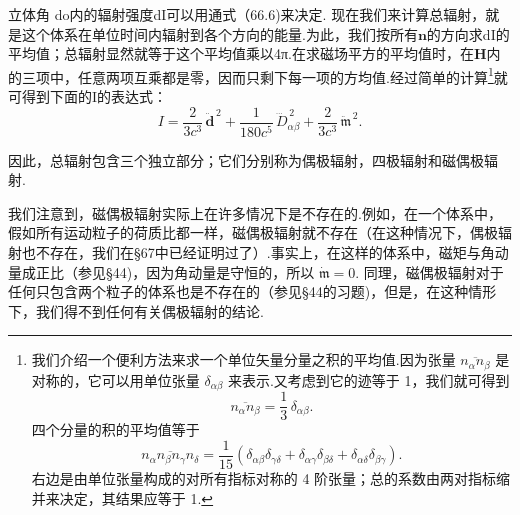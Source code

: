 立体角 do内的辐射强度dI可以用通式（66.6)来决定. 现在我们来计算总辐射，就是这个体系在单位时间内辐射到各个方向的能量.为此，我们按所有$\boldsymbol{n}$的方向求dI的平均值；总辐射显然就等于这个平均值乘以4π.在求磁场平方的平均值时，在$\boldsymbol{H}$内的三项中，任意两项互乘都是零，因而只剩下每一项的方均值.经过简单的计算\footnote{我们介绍一个便利方法来求一个单位矢量分量之积的平均值.因为张量 $\overline{n_\alpha n_\beta}$ 是对称的，它可以用单位张量 $\delta_{\alpha\beta}$ 来表示.又考虑到它的迹等于 1，我们就可得到
\begin{equation*}
  \overline{n_\alpha n_\beta}=\frac{1}{3}\,\delta_{\alpha\beta}.
\end{equation*}
四个分量的积的平均值等于
\begin{equation*}
  \overline{n_\alpha n_\beta n_\gamma n_\delta}=\frac{1}{15}\left(\delta_{\alpha\beta}\delta_{\gamma\delta}
  +\delta_{\alpha\gamma}\delta_{\beta\delta}+\delta_{\alpha\delta}\delta_{\beta\gamma}\right).
\end{equation*}
右边是由单位张量构成的对所有指标对称的 4 阶张量；总的系数由两对指标缩并来决定，其结果应等于 1.}就可得到下面的I的表达式：
\begin{equation}
  I=\frac{2}{3c^3}\,\ddot{\boldsymbol{d}}^{\,2}
  +\frac{1}{180c^5}\,\dddot{D}_{\alpha\beta}^{\,2}
  +\frac{2}{3c^3}\,\ddot{\mathfrak{m}}^{\,2}.
\end{equation}

因此，总辐射包含三个独立部分；它们分别称为偶极辐射，四极辐射和磁偶极辐射.

我们注意到，磁偶极辐射实际上在许多情况下是不存在的.例如，在一个体系中，假如所有运动粒子的荷质比都一样，磁偶极辐射就不存在（在这种情况下，偶极辐射也不存在，我们在§67中已经证明过了）.事实上，在这样的体系中，磁矩与角动量成正比（参见§44)，因为角动量是守恒的，所以 $\dot{\mathfrak{m}}=0$. 同理，磁偶极辐射对于任何只包含两个粒子的体系也是不存在的（参见§44的习题)，但是，在这种情形下，我们得不到任何有关偶极辐射的结论.

